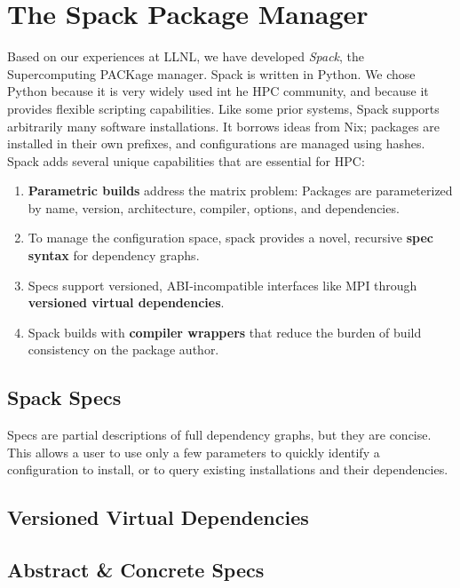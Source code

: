 
\section{The Spack Package Manager}
\label{sec:implementation}
Based on our experiences at LLNL, we have developed
{\it Spack}, the Supercomputing PACKage manager.
Spack is written in Python.  We chose Python because it is
very widely used int he HPC community, and because it provides
flexible scripting capabilities. 
%
Like some prior systems, Spack supports arbitrarily many software installations.
It borrows ideas from Nix; packages are installed in their own prefixes,
and configurations are managed using hashes.
% 
Spack adds several unique capabilities that are essential for HPC:
\begin{enumerate}
\item {\bf Parametric builds} address the matrix problem:
      Packages are parameterized by name, version, architecture, compiler, 
      options, and dependencies.
\item To manage the configuration space, spack provides a novel, 
      recursive {\bf spec syntax} for dependency graphs.
\item Specs support versioned, ABI-incompatible interfaces like MPI through
      {\bf versioned virtual dependencies}.
\item Spack builds with {\bf compiler wrappers} that reduce the burden of build
      consistency on the package author.
\end{enumerate}




\subsection{Spack Specs}\label{sec:specs}

  Specs are partial descriptions of full
dependency graphs, but they are concise.  This allows a user to use
only a few parameters to quickly identify a configuration to install,
or to query existing installations and their dependencies.






\subsection{Versioned Virtual Dependencies}

\subsection{Abstract \& Concrete Specs}
	

